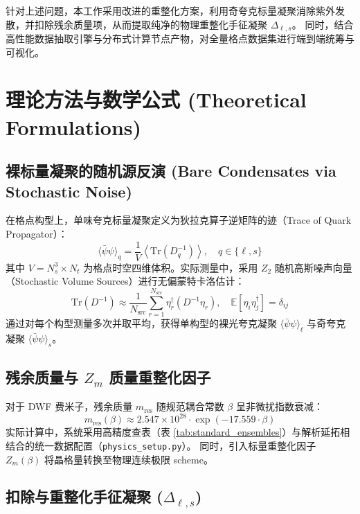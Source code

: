 \documentclass[11pt,a4paper]{ctexart}
\begin{document}
针对上述问题，本工作采用改进的重整化方案，利用奇夸克标量凝聚消除紫外发散，并扣除残余质量项，从而提取纯净的物理重整化手征凝聚 $\Delta_{\ell, s}$。
同时，结合高性能数据抽取引擎与分布式计算节点产物，对全量格点数据集进行端到端统筹与可视化。

\section{理论方法与数学公式 (Theoretical Formulations)}

\subsection{裸标量凝聚的随机源反演 (Bare Condensates via Stochastic Noise)}

在格点构型上，单味夸克标量凝聚定义为狄拉克算子逆矩阵的迹（Trace of Quark Propagator）：
\begin{equation}
\langle \bar{\psi}\psi \rangle_q = \frac{1}{V} \left\langle \text{Tr} \left( D_q^{-1} \right) \right\rangle, \quad q \in \{\ell, s\}
\end{equation}
其中 $V = N_s^3 \times N_t$ 为格点时空四维体积。实际测量中，采用 $Z_2$ 随机高斯噪声向量（Stochastic Volume Sources）进行无偏蒙特卡洛估计：
\begin{equation}
\text{Tr}(D^{-1}) \approx \frac{1}{N_{\text{src}}} \sum_{r=1}^{N_{\text{src}}} \eta_r^\dagger \left( D^{-1} \eta_r \right), \quad \mathbb{E}[\eta_i \eta_j^\dagger] = \delta_{ij}
\end{equation}
通过对每个构型测量多次并取平均，获得单构型的裸光夸克凝聚 $\langle\bar{\psi}\psi\rangle_\ell$ 与奇夸克凝聚 $\langle\bar{\psi}\psi\rangle_s$。

\subsection{\texorpdfstring{残余质量与 $Z_m$ 质量重整化因子}{残余质量与 Zm 质量重整化因子}}

对于 DWF 费米子，残余质量 $m_{\text{res}}$ 随规范耦合常数 $\beta$ 呈非微扰指数衰减：
\begin{equation}
m_{\text{res}}(\beta) \approx 2.547 \times 10^{28} \cdot \exp(-17.559 \cdot \beta)
\end{equation}
实际计算中，系统采用高精度查表（表 \ref{tab:standard_ensembles}）与解析延拓相结合的统一数据配置（\texttt{physics\_setup.py}）。
同时，引入标量重整化因子 $Z_m(\beta)$ 将晶格量转换至物理连续极限 scheme。

\subsection{\texorpdfstring{扣除与重整化手征凝聚 ($\Delta_{\ell, s}$)}{扣除与重整化手征凝聚 (Delta_ls)}}
\end{document}

